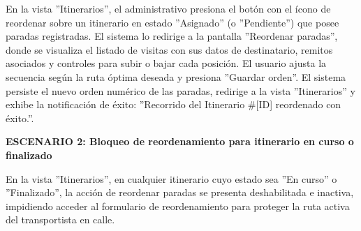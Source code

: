 \documentclass[a4paper,9pt]{article}
\begin{document}
\begin{tcolorbox}
{En la vista ''Itinerarios'', el administrativo presiona el botón con el ícono de reordenar sobre un itinerario en estado ''Asignado'' (o ''Pendiente'') que posee paradas registradas. El sistema lo redirige a la pantalla ''Reordenar paradas'', donde se visualiza el listado de visitas con sus datos de destinatario, remitos asociados y controles para subir o bajar cada posición. El usuario ajusta la secuencia según la ruta óptima deseada y presiona ''Guardar orden''. El sistema persiste el nuevo orden numérico de las paradas, redirige a la vista ''Itinerarios'' y exhibe la notificación de éxito: ''Recorrido del Itinerario \#[ID] reordenado con éxito.''.\par\vspace{2.5pt}
\noindent\textbf{\textcolor{secondarydark}{ESCENARIO 2:  Bloqueo de reordenamiento para itinerario en curso o finalizado}}\par\vspace{1pt}
En la vista ''Itinerarios'', en cualquier itinerario cuyo estado sea ''En curso'' o ''Finalizado'', la acción de reordenar paradas se presenta deshabilitada e inactiva, impidiendo acceder al formulario de reordenamiento para proteger la ruta activa del transportista en calle.\par\vspace{2.5pt}
}\par
\end{tcolorbox}
\end{document}
